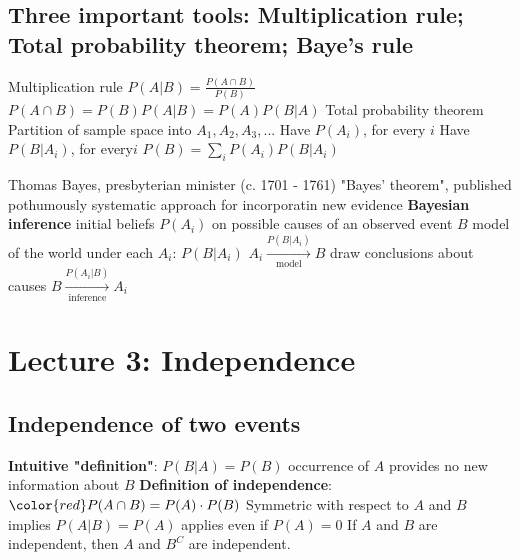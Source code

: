 \subsection{Three \textbf{important} tools: Multiplication rule; Total probability theorem; Baye's rule} 
\begin{outline}
\1 Multiplication rule
  \2 $P(A|B) = \frac{P(A \cap B)}{P(B)}$
  \2 $P(A \cap B) = P(B)P(A|B) = P(A)P(B|A)$
\1 Total probability theorem
  \2 Partition of sample space into $A_1, A_2, A_3, ...$
  \2 Have $P(A_i)$, for every $i$
  \2 Have $P(B|A_i)$, for every$i$
  \2 $P(B) = \sum\limits_{i} P(A_i)P(B|A_i)$
\end{outline}

\begin{outline}
\1 Thomas Bayes, presbyterian minister (c. 1701 - 1761)
\1 "Bayes' theorem", published pothumously
\1 systematic approach for incorporatin new evidence
\1 \textbf{Bayesian inference}
  \2 initial beliefs $P(A_i)$ on possible causes of an observed event $B$
  \2 model of the world under each $A_i$: $P(B|A_i)$
    \3 $A_i \xrightarrow[\text{model}]{P(B|A_i)} B$
  \2 draw conclusions about causes
    \3 $B \xrightarrow[\text{inference}]{P(A_i|B)} A_i$
\end{outline}




\section{Lecture 3: Independence}
\subsection{Independence of two events} 
\begin{outline}
\1 \textbf{Intuitive "definition"}: $P(B|A) = P(B)$
  \2 occurrence of $A$ provides no new information about $B$
\1 \textbf{Definition of independence}: $\color{red} P(A \cap B) = P(A) \cdot P(B)$
  \2 Symmetric with respect to $A$ and $B$
  \2 implies $P(A|B) = P(A)$
  \2 applies even if $P(A) = 0$
\1 If $A$ and $B$ are independent, then $A$ and $B^C$ are independent.
\end{outline}


